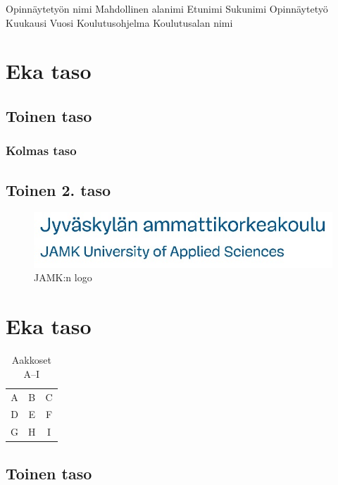 \documentclass{jamk}
\begin{document}
\makejamktitle
    {Opinnäytetyön nimi}     %
    {Mahdollinen alanimi}    %
    {Etunimi Sukunimi}{}{}{} %
    {Opinnäytetyö}           %
    {Kuukausi Vuosi}         %
    {Koulutusohjelma}        %
    {Koulutusalan nimi}      %

\section{Eka taso}
\lipsum[1]
\lipsum[2]

\subsection{Toinen taso}
\subsubsection{Kolmas taso}
\lipsum[1]
\lipsum[2]
\lipsum[3]
\lipsum[4]

\subsection{Toinen 2. taso}
\lipsum[1]
\begin{figure}
  \includegraphics{jamkfi_long.png}
  \caption{JAMK:n logo}
\end{figure}
\lipsum[2]
\lipsum[3]

\section{Eka taso}
\lipsum[1]
\begin{table}[h]
  \caption{Aakkoset A--I}
  \begin{tabular}{ c | c | c }
    A & B & C \\
    D & E & F \\
    G & H & I \\
  \end{tabular}
\end{table}

\subsection{Toinen taso}
\lipsum[1]
\lipsum[2]
\lipsum[3]
\end{document}
